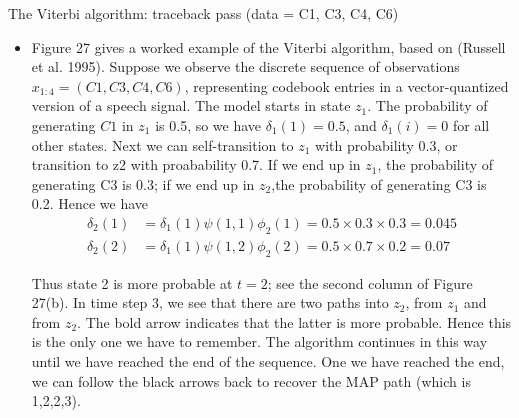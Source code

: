 \documentclass[10pt,mathserif]{beamer}
\begin{document}
\begin{frame}{The Viterbi algorithm: traceback pass (data = C1, C3, C4, C6)}
\begin{itemize}
    \item Figure 27 gives a worked example of the Viterbi algorithm, based on (Russell et al. 1995). Suppose we observe the discrete sequence of observations $x_{1:4} = (C1, C3, C4, C6)$, representing codebook entries in a vector-quantized version of a speech signal. The model starts in state $z_1$. The probability of generating $C1$ in $z_1$ is 0.5, so we have $\delta_1(1) = 0.5$, and $\delta_1(i) = 0$ for all other states. Next we can self-transition to $z_1$ with probability 0.3, or transition to z2 with proabability 0.7. If we end up in $z_1$, the probability of generating C3 is 0.3; if we end up in $z_2$,the probability of generating C3 is 0.2. Hence we have
    \begin{equation}
        \begin{split}
            \delta_2(1) & = \delta_1(1)\psi(1, 1)\phi_2(1) = 0.5 \times 0.3 \times 0.3 = 0.045\\
            \delta_2(2) & = \delta_1(1)\psi(1, 2)\phi_2(2) = 0.5 \times 0.7 \times 0.2 = 0.07
        \end{split}
    \end{equation}
    
    Thus state 2 is more probable at $t = 2$; see the second column of Figure 27(b). In time step 3, we see that there are two paths into $z_2$, from $z_1$ and from $z_2$. The bold arrow indicates that the latter is more probable. Hence this is the only one we have to remember. The algorithm continues in this way until we have reached the end of the sequence. One we have reached the end, we can follow the black arrows back to recover the MAP path (which is 1,2,2,3).
\end{itemize}
\end{frame}
\end{document}
